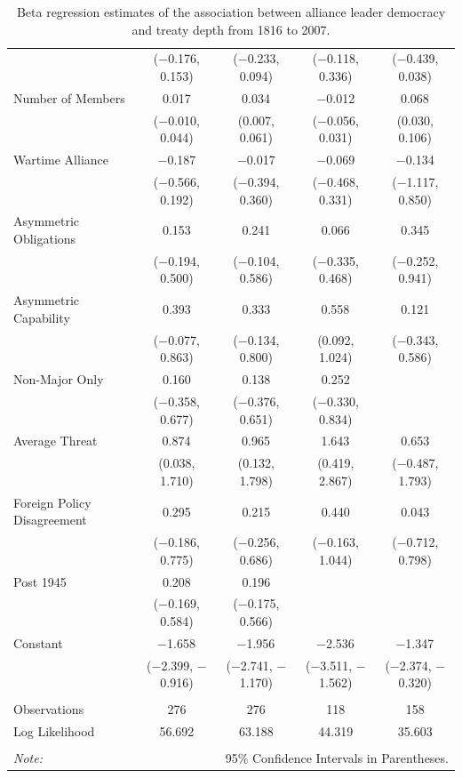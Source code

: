 \documentclass[12pt]{article}
\begin{document}
\begin{table}[!htbp]
{\begin{tabular}{@{\extracolsep{5pt}}lcccc}
  & ($-$0.176, 0.153) & ($-$0.233, 0.094) & ($-$0.118, 0.336) & ($-$0.439, 0.038) \\ 
  Number of Members & 0.017 & 0.034$^{}$ & $-$0.012 & 0.068$^{}$ \\ 
  & ($-$0.010, 0.044) & (0.007, 0.061) & ($-$0.056, 0.031) & (0.030, 0.106) \\ 
  Wartime Alliance & $-$0.187 & $-$0.017 & $-$0.069 & $-$0.134 \\ 
  & ($-$0.566, 0.192) & ($-$0.394, 0.360) & ($-$0.468, 0.331) & ($-$1.117, 0.850) \\ 
  Asymmetric Obligations & 0.153 & 0.241 & 0.066 & 0.345 \\ 
  & ($-$0.194, 0.500) & ($-$0.104, 0.586) & ($-$0.335, 0.468) & ($-$0.252, 0.941) \\ 
  Asymmetric Capability & 0.393 & 0.333 & 0.558$^{}$ & 0.121 \\ 
  & ($-$0.077, 0.863) & ($-$0.134, 0.800) & (0.092, 1.024) & ($-$0.343, 0.586) \\ 
  Non-Major Only & 0.160 & 0.138 & 0.252 &  \\ 
  & ($-$0.358, 0.677) & ($-$0.376, 0.651) & ($-$0.330, 0.834) &  \\ 
  Average Threat & 0.874$^{}$ & 0.965$^{}$ & 1.643$^{}$ & 0.653 \\ 
  & (0.038, 1.710) & (0.132, 1.798) & (0.419, 2.867) & ($-$0.487, 1.793) \\ 
  Foreign Policy Disagreement & 0.295 & 0.215 & 0.440 & 0.043 \\ 
  & ($-$0.186, 0.775) & ($-$0.256, 0.686) & ($-$0.163, 1.044) & ($-$0.712, 0.798) \\ 
  Post 1945 & 0.208 & 0.196 &  &  \\ 
  & ($-$0.169, 0.584) & ($-$0.175, 0.566) &  &  \\ 
  Constant & $-$1.658$^{}$ & $-$1.956$^{}$ & $-$2.536$^{}$ & $-$1.347$^{}$ \\ 
  & ($-$2.399, $-$0.916) & ($-$2.741, $-$1.170) & ($-$3.511, $-$1.562) & ($-$2.374, $-$0.320) \\ 
 \hline \\[-1.8ex] 
Observations & 276 & 276 & 118 & 158 \\ 
Log Likelihood & 56.692 & 63.188 & 44.319 & 35.603 \\ 
\hline 
\hline \\[-1.8ex] 
\textit{Note:}  & \multicolumn{4}{r}{95\% Confidence Intervals in Parentheses.} \\ 
\end{tabular} 
}
  \caption{Beta regression estimates of the association between alliance leader democracy and treaty depth from 1816 to 2007.} 
  \label{tab:reg-est} 
\end{table} 
\end{document}
